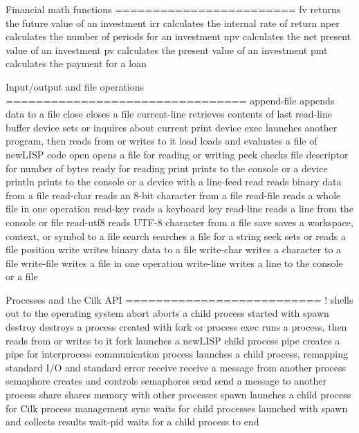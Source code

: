 \documentclass[cn,11pt]{elegantbook}
\begin{document}
Financial math functions
========================
fv                returns the future value of an investment
irr               calculates the internal rate of return
nper              calculates the number of periods for an investment
npv               calculates the net present value of an investment
pv                calculates the present value of an investment
pmt               calculates the payment for a loan

Input/output and file operations
================================
append-file       appends data to a file
close             closes a file
current-line      retrieves contents of last read-line buffer
device            sets or inquires about current print device
exec              launches another program, then reads from or writes to it
load              loads and evaluates a file of newLISP code
open              opens a file for reading or writing
peek              checks file descriptor for number of bytes ready for reading
print             prints to the console or a device
println           prints to the console or a device with a line-feed
read              reads binary data from a file
read-char         reads an 8-bit character from a file
read-file         reads a whole file in one operation
read-key          reads a keyboard key
read-line         reads a line from the console or file
read-utf8         reads UTF-8 character from a file
save              saves a workspace, context, or symbol to a file
search            searches a file for a string
seek              sets or reads a file position
write             writes binary data to a file
write-char        writes a character to a file
write-file        writes a file in one operation
write-line        writes a line to the console or a file

Processes and the Cilk API
==========================
!                 shells out to the operating system
abort             aborts a child process started with spawn
destroy           destroys a process created with fork or process
exec              runs a process, then reads from or writes to it
fork              launches a newLISP child process
pipe              creates a pipe for interprocess communication
process           launches a child process, remapping standard I/O and standard error
receive           receive a message from another process
semaphore         creates and controls semaphores
send              send a message to another process
share             shares memory with other processes
spawn             launches a child process for Cilk process management
sync              waits for child processes launched with spawn and collects results
wait-pid          waits for a child process to end
\end{document}
